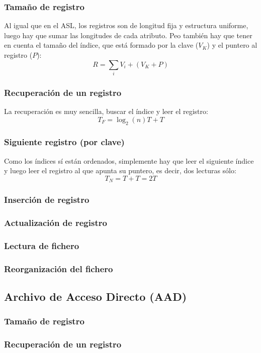 \subsubsection{Tamaño de registro}
Al igual que en el ASL, los registros son de longitud fija y estructura uniforme, luego hay que sumar las longitudes de cada atributo. Peo también hay que tener en cuenta el tamaño del índice, que está formado por la clave ($V_K$) y el puntero al registro ($P$):
\[
R=\sum_iV_i + (V_K+P)
\]
\subsubsection{Recuperación de un registro}
La recuperación es muy sencilla, buscar el índice y leer el registro:
\[
T_F=\log_2(n)T+T
\]
\subsubsection{Siguiente registro (por clave)}
Como los índices sí están ordenados, simplemente hay que leer el siguiente índice y luego leer el registro al que apunta su puntero, es decir, dos lecturas sólo:
\[
T_N=T+T=2T
\]
\subsubsection{Inserción de registro}
\subsubsection{Actualización de registro}
\subsubsection{Lectura de fichero}
\subsubsection{Reorganización del fichero}

\subsection{Archivo de Acceso Directo (AAD)}

\subsubsection{Tamaño de registro}
\subsubsection{Recuperación de un registro}

